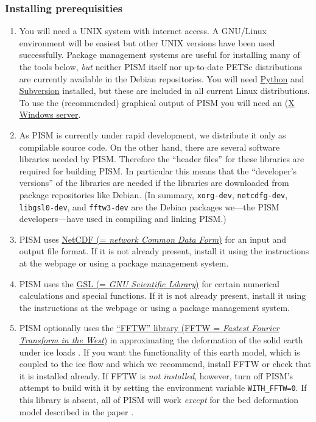 \documentclass[11pt,final]{amsart}
\begin{document}
\subsubsection*{Installing prerequisities}
\renewcommand{\labelenumi}{\textbf{\arabic{enumi}.}~}
\begin{enumerate}
\item You will need a UNIX system with internet access.  A GNU/Linux environment will be easiest but other UNIX versions have been used successfully.  Package management systems are useful for installing many of the tools below, \emph{but} neither PISM itself nor up-to-date PETSc distributions are currently available in the Debian repositories.  You will need \href{http://www.python.org/}{Python} and \href{http://subversion.tigris.org/}{Subversion} installed, but these are included in all current Linux distributions.  To use the (recommended) graphical output of PISM you will need an  (\href{http://www.x.org/}{X Windows server}.
\item As PISM is currently under rapid development, we distribute it only as compilable source code.  On the other hand, there are several software libraries needed by PISM.  Therefore the ``header files'' for these libraries are required for building PISM.  In particular this means that the ``developer's versions'' of the libraries are needed if the libraries are downloaded from package repositories like Debian.  (In summary, \verb|xorg-dev|, \verb|netcdfg-dev|, \verb|libgsl0-dev|, and \verb|fftw3-dev| are the Debian packages we---the PISM developers---have used in compiling and linking PISM.)

\item PISM uses \href{http://www.unidata.ucar.edu/software/netcdf/}{NetCDF (= \emph{network Common Data Form})} for an input and output file format.   If it is not already present, install it using the instructions at the webpage or using a package management system.

\item PISM uses the \href{http://www.gnu.org/software/gsl/}{GSL (= \emph{GNU Scientific Library})} for certain numerical calculations and special functions.  If it is not already present, install it using the instructions at the webpage or using a package management system.

\item PISM optionally uses the \href{http://www.fftw.org/}{``FFTW'' library (FFTW = \emph{Fastest Fourier Transform in the West})} in approximating the deformation of the solid earth under ice loads \cite{BLKfastearth}.  If you want the functionality of this earth model, which is coupled to the ice flow and which we recommend, install FFTW or check that it is installed already.  If FFTW is \emph{not installed}, however, turn off PISM's attempt to build with it by setting the environment variable \verb|WITH_FFTW=0|.   If this library is absent, all of PISM will work \emph{except} for the bed deformation model described in the paper \cite{BLKfastearth}.


\end{enumerate}
\end{document}
